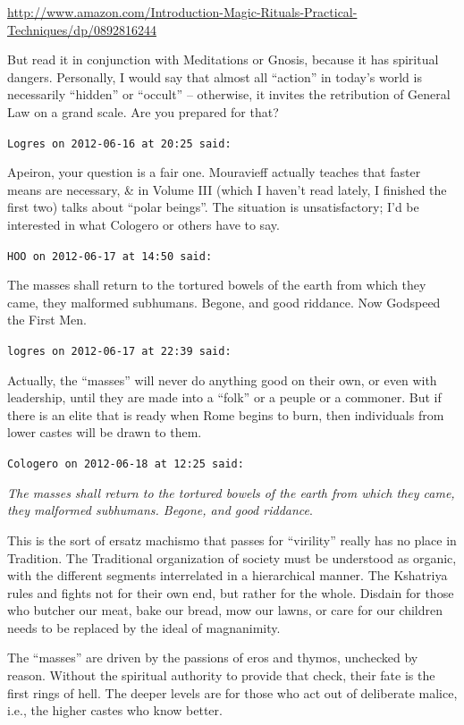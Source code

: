 \begin{footnotesize}
\begin{sffamily}
\url{http://www.amazon.com/Introduction-Magic-Rituals-Practical-Techniques/dp/0892816244}

But read it in conjunction with Meditations or Gnosis, because it has spiritual dangers. Personally, I would say that almost all ``action'' in today's world is necessarily ``hidden'' or ``occult'' -- otherwise, it invites the retribution of General Law on a grand scale. Are you prepared for that?

\hfill

\texttt{Logres on 2012-06-16 at 20:25 said:}

Apeiron, your question is a fair one. Mouravieff actually teaches that faster means are necessary, \& in Volume III (which I haven't read lately, I finished the first two) talks about ``polar beings''. The situation is unsatisfactory; I'd be interested in what Cologero or others have to say.

\hfill

\texttt{HOO on 2012-06-17 at 14:50 said:}

The masses shall return to the tortured bowels of the earth from which they came, they malformed subhumans. Begone, and good riddance. Now Godspeed the First Men.

\hfill

\texttt{logres on 2012-06-17 at 22:39 said:}

Actually, the ``masses'' will never do anything good on their own, or even with leadership, until they are made into a ``folk'' or a peuple or a commoner. But if there is an elite that is ready when Rome begins to burn, then individuals from lower castes will be drawn to them.

\hfill

\texttt{Cologero on 2012-06-18 at 12:25 said:}

\emph{The masses shall return to the tortured bowels of the earth from which they came, they malformed subhumans. Begone, and good riddance}.

This is the sort of ersatz machismo that passes for ``virility'' really has no place in Tradition. The Traditional organization of society must be understood as organic, with the different segments interrelated in a hierarchical manner. The Kshatriya rules and fights not for their own end, but rather for the whole. Disdain for those who butcher our meat, bake our bread, mow our lawns, or care for our children needs to be replaced by the ideal of magnanimity.

The ``masses'' are driven by the passions of eros and thymos, unchecked by reason. Without the spiritual authority to provide that check, their fate is the first rings of hell. The deeper levels are for those who act out of deliberate malice, i.e., the higher castes who know better.


\end{sffamily}
\end{footnotesize}

